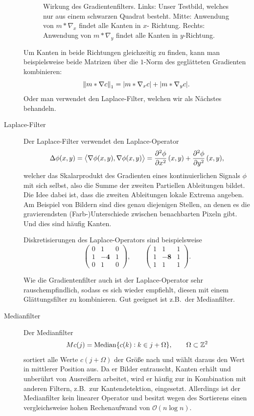 \begin{example}
\begin{description}
\begin{figure}[ht]
\begin{minipage}{0.3\textwidth}
    \end{minipage}
  \caption{Wirkung des Gradientenfilters. Links: Unser Testbild, welches nur aus einem schwarzen 
    Quadrat besteht. Mitte: Anwendung von $ m * \nabla_{x} $ findet alle Kanten in $ x $-
    Richtung. Rechts: Anwendung von $ m * \nabla_{y} $ findet alle Kanten in $ y $-Richtung.}
  \label{fig:Gradient}
  \end{figure}
  Um Kanten in beide Richtungen gleichzeitig zu finden, kann man beispielsweise beide Matrizen über 
  die $ 1 $-Norm des geglätteten Gradienten kombinieren:
  \[
    \norm{m * \nabla c}_{1} = |m * \nabla_{x} c| + |m * \nabla_{y} c|.
  \]
  Oder man verwendet den Laplace-Filter, welchen wir als Nächstes behandeln.
\item [Laplace-Filter] Der Laplace-Filter verwendet den Laplace-Operator
  \[
      \Delta \phi(x,y) 
    = \left\langle \nabla \phi(x,y), \nabla \phi(x,y) \right\rangle
    = \dpd[2]{\phi}{x}(x,y) + \dpd[2]{\phi}{y}(x,y),
  \]
  welcher das Skalarprodukt des Gradienten eines kontinuierlichen Signals $ \phi $ mit sich selbst, 
  also die Summe der zweiten Partiellen Ableitungen bildet. Die Idee dabei ist, dass die zweiten
  Ableitungen lokale Extrema angeben. Am Beispiel von Bildern sind dies genau diejenigen Stellen,
  an denen es die gravierendsten (Farb-)Unterschiede zwischen benachbarten Pixeln gibt. Und dies
  sind häufig Kanten.
  
  Diskretisierungen des Laplace-Operators sind beispielsweise
  \[
    \begin{pmatrix}
      0 & 1 & 0 \\
      1 & \mathbf{-4} & 1 \\
      0 & 1 & 0
    \end{pmatrix}, \qquad
    \begin{pmatrix}
      1 & 1 & 1 \\
      1 & \mathbf{-8} & 1 \\
      1 & 1 & 1
    \end{pmatrix}.
  \]
  
  Wie die Gradientenfilter auch ist der Laplace-Operator sehr rauschempfindlich, sodass es sich
  wieder empfiehlt, diesen mit einem Glättungsfilter zu kombinieren. Gut geeignet ist z.B.\ der
  Medianfilter.
\item [Medianfilter] Der Medianfilter
  \[
    Mc(j) = \operatorname{Median}\{ c(k) : k \in j + \Omega \}, \qquad \Omega \subset \mathbb{Z}^{2}
  \]
  sortiert alle Werte $ c(j + \Omega) $ der Größe nach und wählt daraus den Wert in mittlerer
  Position aus. Da er Bilder entrauscht, Kanten erhält und unberührt von Ausreißern arbeitet, wird 
  er häufig zur in Kombination mit anderen Filtern, z.B.\ zur Kantendetektion, eingesetzt.
  Allerdings ist der Medianfilter kein linearer Operator und besitzt wegen des Sortierens einen
  vergleichsweise hohen Rechenaufwand von $ \mathcal{O}(n \log n) $.
\end{description}
\end{example}